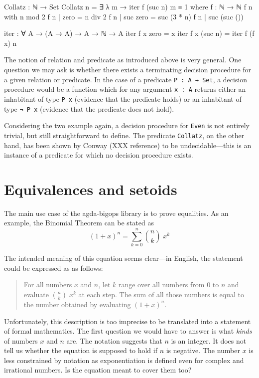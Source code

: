 \begin{listing}[h]
\begin{agdacode}
Collatz : ℕ → Set
Collatz n = ∃ λ m → iter f (suc n) m ≡ 1
  where
    f : ℕ → ℕ
    f n with n mod 2
    f n | zero     = n div 2
    f n | suc zero = suc (3 * n)
    f n | suc (suc ())

    iter : ∀ {A} → (A → A) → A → ℕ → A
    iter f x zero    = x
    iter f x (suc n) = iter f (f x) n
\end{agdacode}
\end{listing}


The notion of relation and predicate as introduced above is very general. One question we may ask is whether there exists a terminating decision procedure for a given relation or predicate. In the case of a predicate \texttt{P : A → Set}, a decision procedure would be a function which for any argument \texttt{x : A} returns either an inhabitant of type \texttt{P x} (evidence that the predicate holds) or an inhabitant of type \texttt{¬ P x} (evidence that the predicate does not hold).

Considering the two example again, a decision procedure for \texttt{Even} is not entirely trivial, but still straightforward to define. The predicate \texttt{Collatz}, on the other hand, has been shown by Conway (XXX reference) to be undecidable---this is an instance of a predicate for which no decision procedure exists.

\section{Equivalences and setoids}

The main use case of the agda-bigops library is to prove equalities. As an example, the Binomial Theorem can be stated as \[ (1 + x)^n = \sum_{k = 0}^n \binom{n}{k} \; x^k \]

The intended meaning of this equation seems clear---in English, the statement could be expressed as as follows: \begin{quote}For all numbers \(x\) and \(n\), let \(k\) range over all numbers from \(0\) to \(n\) and evaluate \(\binom{n}{k} \; x^k\) at each step. The sum of all those numbers is equal to the number obtained by evaluating \((1 + x)^n\).\end{quote}

Unfortunately, this description is too imprecise to be translated into a statement of formal mathematics. The first question we would have to answer is what \emph{kinds} of numbers \(x\) and \(n\) are. The notation suggests that \(n\) is an integer. It does not tell us whether the equation is supposed to hold if \(n\) is negative. The number \(x\) is less constrained by notation as exponentiation is defined even for complex and irrational numbers. Is the equation meant to cover them too?


